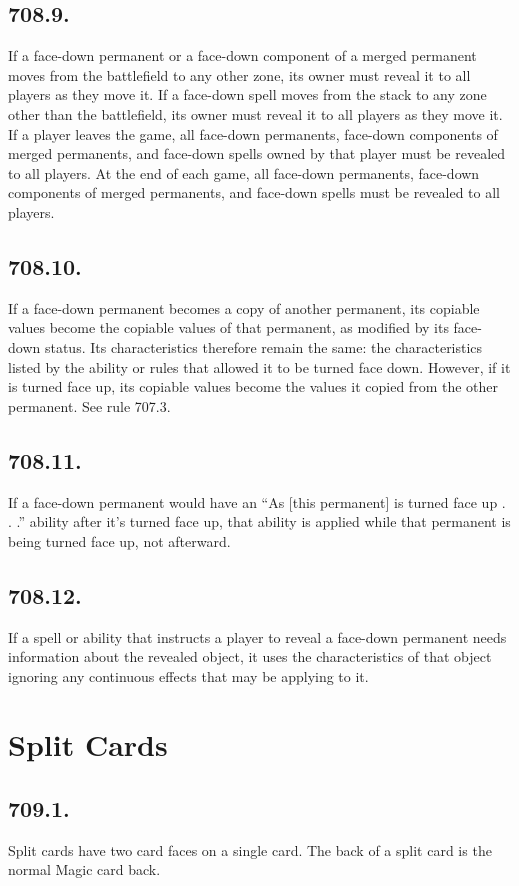 \subsection*{708.9.}
If a face-down permanent or a face-down component of a merged permanent moves from the battlefield to any other zone, its owner must reveal it to all players as they move it. If a face-down spell moves from the stack to any zone other than the battlefield, its owner must reveal it to all players as they move it. If a player leaves the game, all face-down permanents, face-down components of merged permanents, and face-down spells owned by that player must be revealed to all players. At the end of each game, all face-down permanents, face-down components of merged permanents, and face-down spells must be revealed to all players.

\subsection*{708.10.}
If a face-down permanent becomes a copy of another permanent, its copiable values become the copiable values of that permanent, as modified by its face-down status. Its characteristics therefore remain the same: the characteristics listed by the ability or rules that allowed it to be turned face down. However, if it is turned face up, its copiable values become the values it copied from the other permanent. See rule 707.3.

\subsection*{708.11.}
If a face-down permanent would have an “As [this permanent] is turned face up . . .” ability after it’s turned face up, that ability is applied while that permanent is being turned face up, not afterward.

\subsection*{708.12.}
If a spell or ability that instructs a player to reveal a face-down permanent needs information about the revealed object, it uses the characteristics of that object ignoring any continuous effects that may be applying to it.

\section{Split Cards}
\subsection*{709.1.}
Split cards have two card faces on a single card. The back of a split card is the normal Magic card back.

